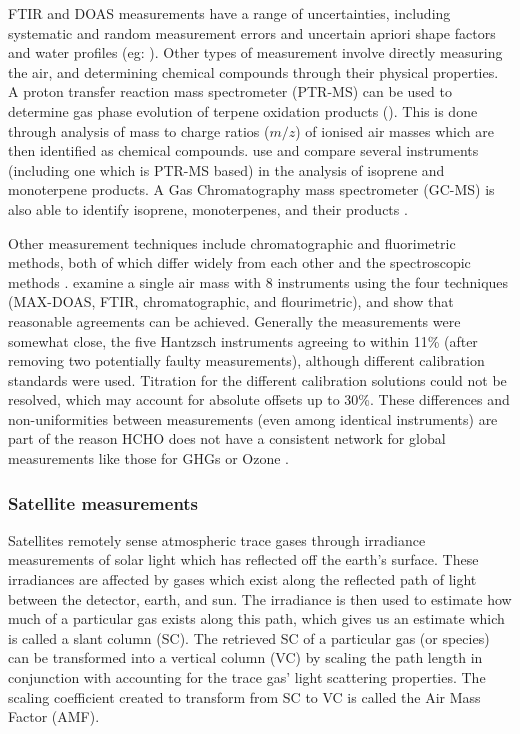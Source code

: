     FTIR and DOAS measurements have a range of uncertainties, including systematic and random measurement errors and uncertain apriori shape factors and water profiles (eg: \textcite{Franco2015}).
    Other types of measurement involve directly measuring the air, and determining chemical compounds through their physical properties.
    A proton transfer reaction mass spectrometer (PTR-MS) can be used to determine gas phase evolution of terpene oxidation products (\textcite[eg.]{Lee2006a,Nguyen2014,Wolfe2016}).
    This is done through analysis of mass to charge ratios ($m/z$) of ionised air masses which are then identified as chemical compounds.
    \textcite{Nguyen2014} use and compare several instruments (including one which is PTR-MS based) in the analysis of isoprene and monoterpene products.
    A Gas Chromatography mass spectrometer (GC-MS) is also able to identify isoprene, monoterpenes, and their products \textcite[eg.]{Nguyen2014,Lerner2017}.
        
    Other measurement techniques include chromatographic and fluorimetric methods, both of which differ widely from each other and the spectroscopic methods \parencite{Hak2005}.
    \textcite{Hak2005} examine a single air mass with 8 instruments using the four techniques (MAX-DOAS, FTIR, chromatographic, and flourimetric), and show that reasonable agreements can be achieved.
    Generally the measurements were somewhat close, the five Hantzsch instruments agreeing to within 11\% (after removing two potentially faulty measurements), although different calibration standards were used.
    Titration for the different calibration solutions could not be resolved, which may account for absolute offsets up to 30\%.
    These differences and non-uniformities between measurements (even among identical instruments) are part of the reason HCHO does not have a consistent network for global measurements like those for GHGs or Ozone \parencite{FortemsCheiney2012}.
  
    \subsubsection{Satellite measurements}
      \label{LR:HCHO:Sat}
      
      Satellites remotely sense atmospheric trace gases through irradiance measurements of solar light which has reflected off the earth's surface. 
      These irradiances are affected by gases which exist along the reflected path of light between the detector, earth, and sun. 
      The irradiance is then used to estimate how much of a particular gas exists along this path, which gives us an estimate which is called a slant column (SC).
      The retrieved SC of a particular gas (or species) can be transformed into a vertical column (VC) by scaling the path length in conjunction with accounting for the trace gas' light scattering properties.
      The scaling coefficient created to transform from SC to VC is called the Air Mass Factor (AMF).
      
